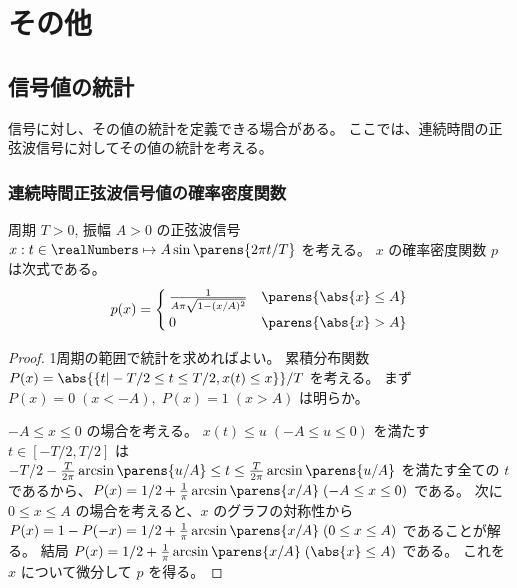 \part{その他}
    \chapter{信号値の統計}
        信号に対し、その値の統計を定義できる場合がある。
        ここでは、連続時間の正弦波信号に対してその値の統計を考える。
        \section{連続時間正弦波信号値の確率密度関数}
            \begin{shadebox}
                周期 $T>0$, 振幅 $A>0$ の正弦波信号 $x:t\in\realNumbers\mapsto A\sin\parens{2\pi t/T}$ を考える。
                $x$ の確率密度関数 $p$ は次式である。
                \[
                    p(x) = \begin{cases}
                        \frac{1}{A\pi\sqrt{1-(x/A)^2}} & \parens{\abs{x} \leq A} \\
                        0 & \parens{\abs{x} > A} \\
                    \end{cases}
                \]
            \end{shadebox}
            \begin{proof}
                \quad\par
                1周期の範囲で統計を求めればよい。
                累積分布関数 $P(x) = \abs{\{t|-T/2\leq t\leq T/2, x(t) \leq x\}}/T$ を考える。
                まず $P(x) = 0\;(x < -A),\;P(x) = 1\;(x > A)$ は明らか。
                \par
                $-A \leq x \leq 0$ の場合を考える。
                $x(t) \leq u\;(-A \leq u \leq 0)$ を満たす $t\in[-T/2,T/2]$ は $-T/2 - \frac{T}{2\pi}\arcsin\parens{u/A}\leq t \leq \frac{T}{2\pi}\arcsin\parens{u/A}$ を満たす全ての $t$ であるから、$P(x) = 1/2 + \frac{1}{\pi}\arcsin\parens{x/A}\;(-A\leq x\leq 0)$ である。
                次に$0 \leq x \leq A$ の場合を考えると、$x$ のグラフの対称性から $P(x) = 1 - P(-x) = 1/2 + \frac{1}{\pi}\arcsin\parens{x/A}\;(0 \leq x \leq A)$ であることが解る。
                結局 $P(x) = 1/2 + \frac{1}{\pi}\arcsin\parens{x/A}\;(\abs{x}\leq A)$ である。
                これを $x$ について微分して $p$ を得る。
            \end{proof}
